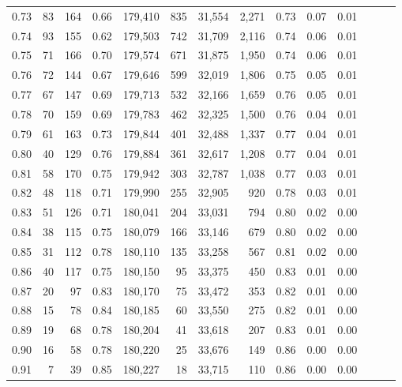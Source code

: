 \begin{tabular}{rrrrrrrrrrrrrr}
0.73 &      83 &  164 &  0.66 &  179,410 &      835 &  31,554 &   2,271 &  0.73 &  0.07 &      0.01 \\
0.74 &      93 &  155 &  0.62 &  179,503 &      742 &  31,709 &   2,116 &  0.74 &  0.06 &      0.01 \\
0.75 &      71 &  166 &  0.70 &  179,574 &      671 &  31,875 &   1,950 &  0.74 &  0.06 &      0.01 \\
0.76 &      72 &  144 &  0.67 &  179,646 &      599 &  32,019 &   1,806 &  0.75 &  0.05 &      0.01 \\
0.77 &      67 &  147 &  0.69 &  179,713 &      532 &  32,166 &   1,659 &  0.76 &  0.05 &      0.01 \\
0.78 &      70 &  159 &  0.69 &  179,783 &      462 &  32,325 &   1,500 &  0.76 &  0.04 &      0.01 \\
0.79 &      61 &  163 &  0.73 &  179,844 &      401 &  32,488 &   1,337 &  0.77 &  0.04 &      0.01 \\
0.80 &      40 &  129 &  0.76 &  179,884 &      361 &  32,617 &   1,208 &  0.77 &  0.04 &      0.01 \\
0.81 &      58 &  170 &  0.75 &  179,942 &      303 &  32,787 &   1,038 &  0.77 &  0.03 &      0.01 \\
0.82 &      48 &  118 &  0.71 &  179,990 &      255 &  32,905 &     920 &  0.78 &  0.03 &      0.01 \\
0.83 &      51 &  126 &  0.71 &  180,041 &      204 &  33,031 &     794 &  0.80 &  0.02 &      0.00 \\
0.84 &      38 &  115 &  0.75 &  180,079 &      166 &  33,146 &     679 &  0.80 &  0.02 &      0.00 \\
0.85 &      31 &  112 &  0.78 &  180,110 &      135 &  33,258 &     567 &  0.81 &  0.02 &      0.00 \\
0.86 &      40 &  117 &  0.75 &  180,150 &       95 &  33,375 &     450 &  0.83 &  0.01 &      0.00 \\
0.87 &      20 &   97 &  0.83 &  180,170 &       75 &  33,472 &     353 &  0.82 &  0.01 &      0.00 \\
0.88 &      15 &   78 &  0.84 &  180,185 &       60 &  33,550 &     275 &  0.82 &  0.01 &      0.00 \\
0.89 &      19 &   68 &  0.78 &  180,204 &       41 &  33,618 &     207 &  0.83 &  0.01 &      0.00 \\
0.90 &      16 &   58 &  0.78 &  180,220 &       25 &  33,676 &     149 &  0.86 &  0.00 &      0.00 \\
0.91 &       7 &   39 &  0.85 &  180,227 &       18 &  33,715 &     110 &  0.86 &  0.00 &      0.00 \\

\end{tabular}
